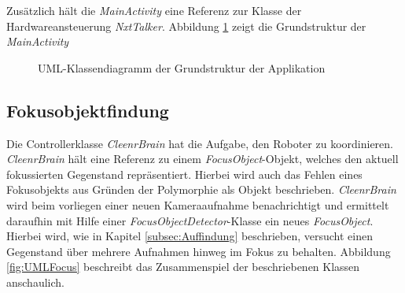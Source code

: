 Zusätzlich hält die \textit{MainActivity} eine Referenz zur Klasse der Hardwareansteuerung \textit{NxtTalker}. Abbildung \ref{fig:UMLActivity} zeigt die Grundstruktur der \textit{MainActivity}

\begin{figure}[H]
\centering
{}
\caption{UML-Klassendiagramm der Grundstruktur der Applikation}
\label{fig:UMLActivity}
\end{figure}

 
\subsection{Fokusobjektfindung}

Die Controllerklasse \textit{CleenrBrain} hat die Aufgabe, den Roboter zu koordinieren. \textit{CleenrBrain} hält eine Referenz zu einem \textit{FocusObject}-Objekt, welches den aktuell fokussierten Gegenstand repräsentiert. Hierbei wird auch das Fehlen eines Fokusobjekts aus Gründen der Polymorphie als Objekt beschrieben. \textit{CleenrBrain} wird beim vorliegen einer neuen Kameraaufnahme benachrichtigt und ermittelt daraufhin mit Hilfe einer \textit{FocusObjectDetector}-Klasse ein neues \textit{FocusObject}. Hierbei wird, wie in Kapitel \ref{subsec:Auffindung} beschrieben, versucht einen Gegenstand über mehrere Aufnahmen hinweg im Fokus zu behalten. Abbildung \ref{fig:UMLFocus} beschreibt das Zusammenspiel der beschriebenen Klassen anschaulich.

